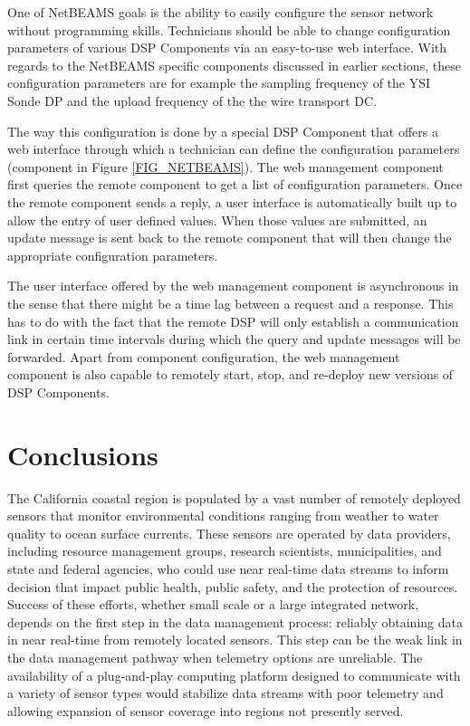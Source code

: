 \documentclass[conference]{IEEEtran}
\begin{document}
One of NetBEAMS goals is the ability to easily configure the sensor
network without programming skills. Technicians should be able to
change configuration parameters of various DSP Components via an
easy-to-use web interface. With regards to the NetBEAMS specific
components discussed in earlier sections, these configuration
parameters are for example the sampling frequency of the YSI Sonde DP
and the upload frequency of the the wire transport DC.

The way this configuration is done by a special DSP Component that
offers a web interface through which a technician can define the
configuration parameters (component  in Figure
\ref{FIG_NETBEAMS}). The web management component first queries the remote
component to get a list of configuration parameters. Once the remote
component sends a reply, a user interface is automatically built up
to allow the entry of user defined values. When those values are
submitted, an update message is sent back to the remote component that
will then change the appropriate configuration parameters.

The user interface offered by the web management component is
asynchronous in the sense that there might be a time lag between a
request and a response. This has to do with the fact that the remote
DSP will only establish a communication link in certain time intervals
during which the query and update messages will be forwarded. Apart
from component configuration, the web management component is also
capable to remotely start, stop, and re-deploy new versions of DSP
Components.

\section{Conclusions}
\label{SEC_CONCLUSION}

The California coastal region is populated by a vast number of
remotely deployed sensors that monitor environmental conditions
ranging from weather to water quality to ocean surface currents.
These sensors are operated by data providers, including resource
management groups, research scientists, municipalities, and state and
federal agencies, who could use near real-time data streams to inform
decision that impact public health, public safety, and the protection
of resources. Success of these efforts, whether small scale or a large
integrated network, depends on the first step in the data management
process: reliably obtaining data in near real-time from remotely
located sensors.  This step can be the weak link in the data
management pathway when telemetry options are unreliable.  The
availability of a plug-and-play computing platform designed to
communicate with a variety of sensor types would stabilize data
streams with poor telemetry and allowing expansion of sensor coverage
into regions not presently served.
\end{document}
